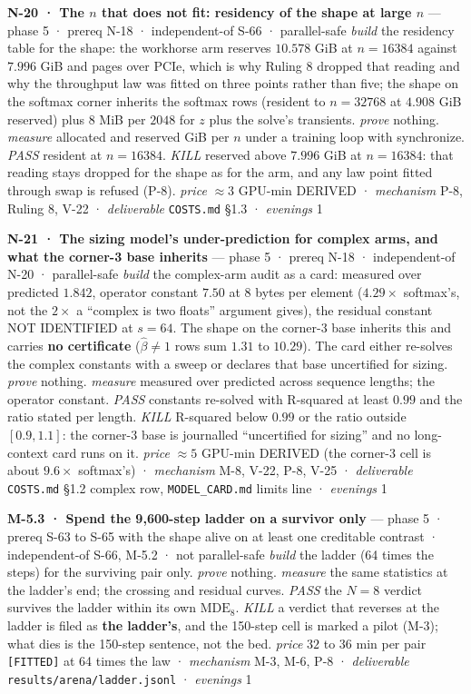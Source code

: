 \documentclass[11pt,a4paper]{article}
\theoremstyle{plain}
\theoremstyle{definition}
\theoremstyle{remark}
\begin{document}
\textbf{N-20 · The \(n\) that does not fit: residency of the shape at
large \(n\)} --- phase 5 · prereq N-18 · independent-of S-66 ·
parallel-safe \emph{build} the residency table for the shape: the
workhorse arm reserves \(10.578\) GiB at \(n=16384\) against \(7.996\)
GiB and pages over PCIe, which is why Ruling 8 dropped that reading and
why the throughput law was fitted on three points rather than five; the
shape on the softmax corner inherits the softmax rows (resident to
\(n=32768\) at \(4.908\) GiB reserved) plus \(8\) MiB per \(2048\) for
\(z\) plus the solve's transients. \emph{prove} nothing. \emph{measure}
allocated and reserved GiB per \(n\) under a training loop with
synchronize. \emph{PASS} resident at \(n=16384\). \emph{KILL} reserved
above \(7.996\) GiB at \(n=16384\): that reading stays dropped for the
shape as for the arm, and any law point fitted through swap is refused
(P-8). \emph{price} \(\approx3\) GPU-min DERIVED · \emph{mechanism} P-8,
Ruling 8, V-22 · \emph{deliverable} \texttt{COSTS.md} §1.3 ·
\emph{evenings} 1

\textbf{N-21 · The sizing model's under-prediction for complex arms, and
what the corner-3 base inherits} --- phase 5 · prereq N-18 ·
independent-of N-20 · parallel-safe \emph{build} the complex-arm audit
as a card: measured over predicted \(1.842\), operator constant \(7.50\)
at 8 bytes per element (\(4.29\times\) softmax's, not the \(2\times\) a
``complex is two floats'' argument gives), the residual constant NOT
IDENTIFIED at \(s=64\). The shape on the corner-3 base inherits this and
carries \textbf{no certificate} (\(\hat\beta\ne1\) rows sum \(1.31\) to
\(10.29\)). The card either re-solves the complex constants with a sweep
or declares that base uncertified for sizing. \emph{prove} nothing.
\emph{measure} measured over predicted across sequence lengths; the
operator constant. \emph{PASS} constants re-solved with R-squared at
least \(0.99\) and the ratio stated per length. \emph{KILL} R-squared
below \(0.99\) or the ratio outside \([0.9,1.1]\): the corner-3 base is
journalled ``uncertified for sizing'' and no long-context card runs on
it. \emph{price} \(\approx5\) GPU-min DERIVED (the corner-3 cell is
about \(9.6\times\) softmax's) · \emph{mechanism} M-8, V-22, P-8, V-25 ·
\emph{deliverable} \texttt{COSTS.md} §1.2 complex row,
\texttt{MODEL\_CARD.md} limits line · \emph{evenings} 1

\textbf{M-5.3 · Spend the 9,600-step ladder on a survivor only} ---
phase 5 · prereq S-63 to S-65 with the shape alive on at least one
creditable contrast · independent-of S-66, M-5.2 · not parallel-safe
\emph{build} the ladder (64 times the steps) for the surviving pair
only. \emph{prove} nothing. \emph{measure} the same statistics at the
ladder's end; the crossing and residual curves. \emph{PASS} the \(N=8\)
verdict survives the ladder within its own \(\mathrm{MDE}_8\).
\emph{KILL} a verdict that reverses at the ladder is filed as
\textbf{the ladder's}, and the 150-step cell is marked a pilot (M-3);
what dies is the 150-step sentence, not the bed. \emph{price} \(32\) to
\(36\) min per pair \texttt{{[}FITTED{]}} at 64 times the law ·
\emph{mechanism} M-3, M-6, P-8 · \emph{deliverable}
\texttt{results/arena/ladder.jsonl} · \emph{evenings} 1
\end{document}
